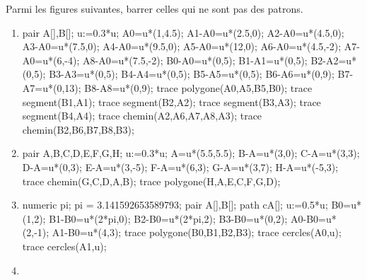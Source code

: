 \begin{exercice*}
    Parmi les figures suivantes, barrer celles qui ne sont pas des patrons.

    \begin{minipage}{0.45\linewidth}
        \begin{enumerate}
            \item \phantom{rrr}
            
            \begin{Geometrie}
                pair A[],B[];
                u:=0.3*u;
                A0=u*(1,4.5);
                A1-A0=u*(2.5,0);
                A2-A0=u*(4.5,0);
                A3-A0=u*(7.5,0);
                A4-A0=u*(9.5,0);
                A5-A0=u*(12,0);
                A6-A0=u*(4.5,-2);
                A7-A0=u*(6,-4);
                A8-A0=u*(7.5,-2);
                B0-A0=u*(0,5);
                B1-A1=u*(0,5);
                B2-A2=u*(0,5);
                B3-A3=u*(0,5);
                B4-A4=u*(0,5);
                B5-A5=u*(0,5);
                B6-A6=u*(0,9);
                B7-A7=u*(0,13);
                B8-A8=u*(0,9);
                trace polygone(A0,A5,B5,B0);
                trace segment(B1,A1);
                trace segment(B2,A2);
                trace segment(B3,A3);
                trace segment(B4,A4);
                trace chemin(A2,A6,A7,A8,A3);
                trace chemin(B2,B6,B7,B8,B3);
            \end{Geometrie}
            \item \phantom{rrr}
            
            \begin{Geometrie}
                pair A,B,C,D,E,F,G,H;
                u:=0.3*u;
                A=u*(5.5,5.5);
                B-A=u*(3,0);
                C-A=u*(3,3);
                D-A=u*(0,3);
                E-A=u*(3,-5);
                F-A=u*(6,3);
                G-A=u*(3,7);
                H-A=u*(-5,3);
                trace chemin(G,C,D,A,B);
                trace polygone(H,A,E,C,F,G,D);                
            \end{Geometrie}
            \item \phantom{rrr}
            
            \begin{Geometrie}
                numeric pi;
                pi = 3.141592653589793;
                pair A[],B[];
                path cA[];
                u:=0.5*u;
                B0=u*(1,2);
                B1-B0=u*(2*pi,0);
                B2-B0=u*(2*pi,2);
                B3-B0=u*(0,2);
                A0-B0=u*(2,-1);
                A1-B0=u*(4,3);
                trace polygone(B0,B1,B2,B3);
                trace cercles(A0,u);
                trace cercles(A1,u);
            \end{Geometrie}
        \end{enumerate}
    \end{minipage}
    \hfill
    \begin{minipage}{0.45\linewidth}        
        \begin{enumerate}
            \setcounter{enumi}{3}
            \item \phantom{rrr}
            

\end{enumerate}
\end{minipage}
\end{exercice*}
